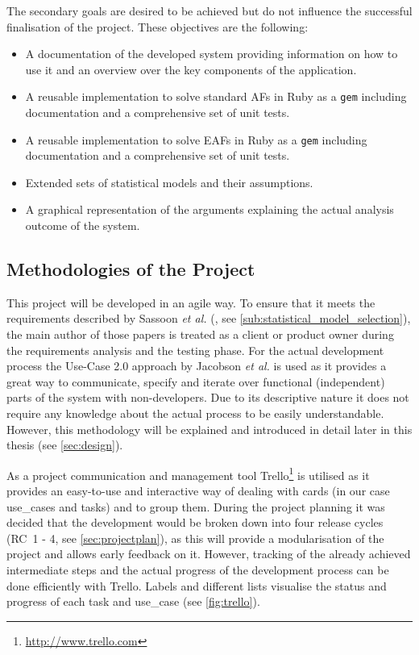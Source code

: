 \bigskip

The secondary goals are desired to be achieved but do not influence the successful finalisation of the project. These objectives are the following:

\begin{itemize}
	\item A documentation of the developed system providing information on how to use it and an overview over the key components of the application.
	\item A reusable implementation to solve standard \glspl{AF} in Ruby as a \texttt{gem} including documentation and a comprehensive set of unit tests.
	\item A reusable implementation to solve \glspl{EAF} in Ruby as a \texttt{gem} including documentation and a comprehensive set of unit tests.
	\item Extended sets of statistical models and their assumptions.
	\item A graphical representation of the arguments explaining the actual analysis outcome of the system.
\end{itemize}


\subsection{Methodologies of the Project}
\label{sub:methodologies}
This project will be developed in an agile way. To ensure that it meets the requirements described by Sassoon \textit{et al.} (\cite{sassoon2016,sassoon2014, sassoon2016CD}, see \autoref{sub:statistical_model_selection}), the main author of those papers is treated as a client or \gls{product owner} during the requirements analysis and the testing phase. For the actual development process the Use-Case 2.0 approach by Jacobson \textit{et al.} \cite{jacobson2011usecase} is used as it provides a great way to communicate, specify and iterate over functional (independent) parts of the system with non-developers. Due to its descriptive nature it does not require any knowledge about the actual process to be easily understandable. However, this methodology will be explained and introduced in detail later in this thesis (see \autoref{sec:design}). 

As a project communication and management tool Trello\footnote{\url{http://www.trello.com}} is utilised as it provides an easy-to-use and interactive way of dealing with cards (in our case \glspl{use_case} and tasks) and to group them. During the project planning it was decided that the development would be broken down into four release cycles (RC~1 - 4, see \autoref{sec:projectplan}), as this will provide a modularisation of the project and allows early feedback on it. However, tracking of the already achieved intermediate steps and the actual progress of the development process can be done efficiently with Trello. Labels and different lists visualise the status and progress of each task and \gls{use_case} (see \autoref{fig:trello}).


